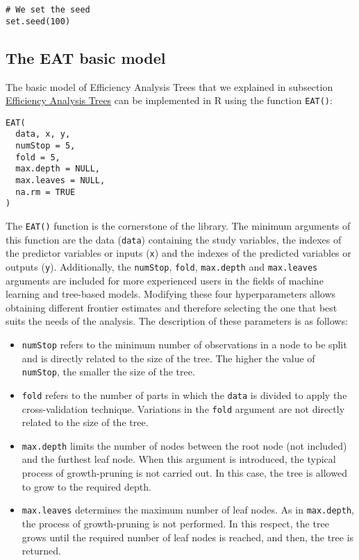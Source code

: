 \begin{verbatim}
# We set the seed
set.seed(100)
\end{verbatim}

\hypertarget{the-eat-basic-model}{%
\subsection{The EAT basic model}\label{the-eat-basic-model}}

The basic model of Efficiency Analysis Trees that we explained in subsection \protect\hyperlink{section2.1}{Efficiency Analysis Trees} can be implemented in R using the function \texttt{EAT()}:

\begin{verbatim}
EAT(
  data, x, y,
  numStop = 5,
  fold = 5,
  max.depth = NULL,
  max.leaves = NULL,
  na.rm = TRUE
)
\end{verbatim}

The \texttt{EAT()} function is the cornerstone of the  library. The minimum arguments of this function are the data (\texttt{data}) containing the study variables, the indexes of the predictor variables or inputs (\texttt{x}) and the indexes of the predicted variables or outputs (\texttt{y}). Additionally, the \texttt{numStop}, \texttt{fold}, \texttt{max.depth} and \texttt{max.leaves} arguments are included for more experienced users in the fields of machine learning and tree-based models. Modifying these four hyperparameters allows obtaining different frontier estimates and therefore selecting the one that best suits the needs of the analysis. The description of these parameters is as follows:

\begin{itemize}
\item
  \texttt{numStop} refers to the minimum number of observations in a node to be split and is directly related to the size of the tree. The higher the value of \texttt{numStop}, the smaller the size of the tree.
\item
  \texttt{fold} refers to the number of parts in which the \texttt{data} is divided to apply the cross-validation technique. Variations in the \texttt{fold} argument are not directly related to the size of the tree.
\item
  \texttt{max.depth} limits the number of nodes between the root node (not included) and the furthest leaf node. When this argument is introduced, the typical process of growth-pruning is not carried out. In this case, the tree is allowed to grow to the required depth.
\item
  \texttt{max.leaves} determines the maximum number of leaf nodes. As in \texttt{max.depth}, the process of growth-pruning is not performed. In this respect, the tree grows until the required number of leaf nodes is reached, and then, the tree is returned.
\end{itemize}

